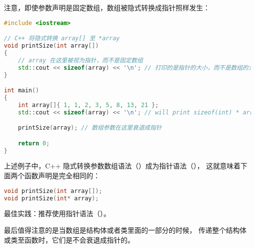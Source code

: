 \documentclass[../../LearnCpp.tex]{subfiles}
\begin{document}
注意，即使参数声明是固定数组，数组被隐式转换成指针照样发生：

\begin{lstlisting}[language=C++]
#include <iostream>

// C++ 将隐式转换 array[] 至 *array
void printSize(int array[])
{
    // array 在这里被视为指针，而不是固定数组
    std::cout << sizeof(array) << '\n'; // 打印的是指针的大小，而不是数组的大小！
}

int main()
{
    int array[]{ 1, 1, 2, 3, 5, 8, 13, 21 };
    std::cout << sizeof(array) << '\n'; // will print sizeof(int) * array length

    printSize(array); // 数组参数在这里衰退成指针

    return 0;
}
\end{lstlisting}

上述例子中，C++ 隐式转换参数数组语法（\acode{[]}）成为指针语法（\acode{*}），
这就意味着下面两个函数声明是完全相同的：

\begin{lstlisting}[language=C++]
void printSize(int array[]);
void printSize(int* array);
\end{lstlisting}

最佳实践：推荐使用指针语法（\acode{*}）。

最后值得注意的是当数组是结构体或者类里面的一部分的时候，
传递整个结构体或类至函数时，它们是不会衰退成指针的。
\end{document}
